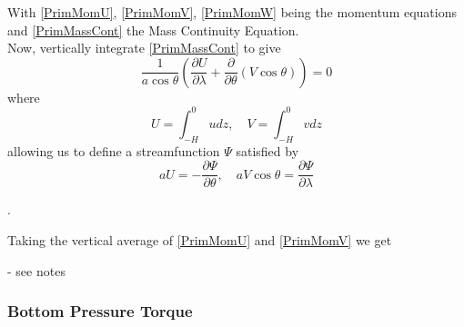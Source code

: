 \documentclass[..\EOYR.tex]{subfiles}
\begin{document}
With \ref{PrimMomU}, \ref{PrimMomV}, \ref{PrimMomW} being the momentum equations and \ref{PrimMassCont} the Mass Continuity Equation.\\
Now, vertically integrate \ref{PrimMassCont} to give
\begin{equation}\label{VIntPrimMasscont}
    \frac{1}{a\cos\theta}\left(\frac{\partial U}{\partial\lambda} + \frac{\partial}{\partial\theta}\left(V\cos\theta\right)\right)=0
\end{equation}
where
\begin{equation}
    U = \int_{-H}^0 u dz,\quad V=\int_{-H}^0 v dz
\end{equation}
allowing us to define a streamfunction $\Psi$ satisfied by
\begin{equation}\label{Streamfunction}
    aU = -\frac{\partial\Psi}{\partial\theta},\quad aV\cos\theta=\frac{\partial\Psi}{\partial\lambda}
\end{equation}


.

Taking the vertical average of \ref{PrimMomU} and \ref{PrimMomV} we get
\begin{equation}
\end{equation}


\citep{Yeager2015} - see notes

\subsubsection*{Bottom Pressure Torque}
\end{document}
